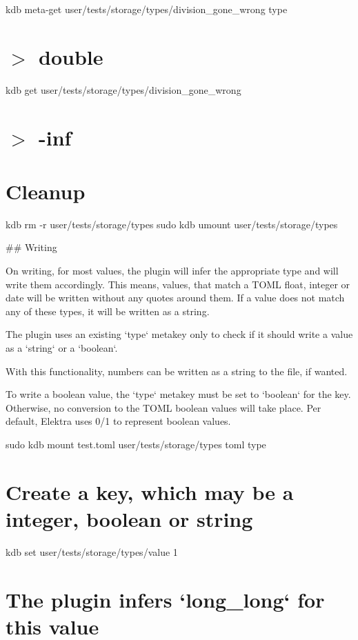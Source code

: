 kdb meta-\/get \textquotesingle{}user/tests/storage/types/division\+\_\+gone\+\_\+wrong\textquotesingle{} \textquotesingle{}type\textquotesingle{} \hypertarget{autotoc_md693_autotoc_md711}{}\section{$>$ double}\label{autotoc_md693_autotoc_md711}
kdb get \textquotesingle{}user/tests/storage/types/division\+\_\+gone\+\_\+wrong\textquotesingle{} \hypertarget{autotoc_md693_autotoc_md712}{}\section{$>$ -\/inf}\label{autotoc_md693_autotoc_md712}
\hypertarget{autotoc_md693_autotoc_md713}{}\section{Cleanup}\label{autotoc_md693_autotoc_md713}
kdb rm -\/r user/tests/storage/types sudo kdb umount user/tests/storage/types 
\begin{DoxyCode}
## Writing

On writing, for most values, the plugin will infer the appropriate type and will write them accordingly.
This means, values, that match a TOML float, integer or date will be written without any quotes around
       them.
If a value does not match any of these types, it will be written as a string.

The plugin uses an existing `type` metakey only to check if it should write a value as a `string` or a
       `boolean`.

With this functionality, numbers can be written as a string to the file, if wanted.

To write a boolean value, the `type` metakey must be set to `boolean` for the key.
Otherwise, no conversion to the TOML boolean values will take place.
Per default, Elektra uses 0/1 to represent boolean values.
\end{DoxyCode}
 sudo kdb mount test.\+toml user/tests/storage/types toml type\hypertarget{autotoc_md693_autotoc_md714}{}\section{Create a key, which may be a integer, boolean or string}\label{autotoc_md693_autotoc_md714}
kdb set \textquotesingle{}user/tests/storage/types/value\textquotesingle{} \textquotesingle{}1\textquotesingle{}\hypertarget{autotoc_md693_autotoc_md715}{}\section{The plugin infers `long\+\_\+long` for this value}\label{autotoc_md693_autotoc_md715}
